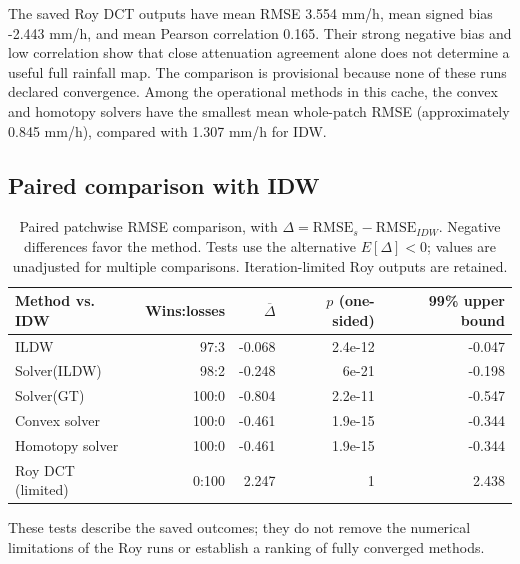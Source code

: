 \documentclass[a4paper,fleqn]{cas-sc}
\begin{document}
The saved Roy DCT outputs have mean RMSE 3.554 mm/h,
mean signed bias -2.443 mm/h, and mean Pearson correlation
0.165. Their strong negative bias and low correlation show that
close attenuation agreement alone does not determine a useful full rainfall
map. The comparison is provisional because none of these runs declared
convergence. Among the operational methods in this cache, the convex and
homotopy solvers have the smallest mean whole-patch RMSE (approximately
0.845 mm/h), compared with 1.307 mm/h for IDW.

\subsection{Paired comparison with IDW}
\begin{table}[!htbp]
\centering\small
\begin{tabular}{lrrrr}
\toprule
Method vs. IDW & Wins:losses & $\overline{\Delta}$ & $p$ (one-sided) & 99\% upper bound \\
\midrule
ILDW & 97:3 & -0.068 & 2.4e-12 & -0.047 \\
Solver(ILDW) & 98:2 & -0.248 & 6e-21 & -0.198 \\
Solver(GT) & 100:0 & -0.804 & 2.2e-11 & -0.547 \\
Convex solver & 100:0 & -0.461 & 1.9e-15 & -0.344 \\
Homotopy solver & 100:0 & -0.461 & 1.9e-15 & -0.344 \\
Roy DCT (limited) & 0:100 & 2.247 & 1 & 2.438 \\
\bottomrule
\end{tabular}
\caption{Paired patchwise RMSE comparison, with $\Delta=\mathrm{RMSE}_{s}-\mathrm{RMSE}_{IDW}$. Negative differences favor the method. Tests use the alternative $E[\Delta]<0$; values are unadjusted for multiple comparisons. Iteration-limited Roy outputs are retained.}
\label{tab:paired-rmse-t-test}
\end{table}

These tests describe the saved outcomes; they do not remove the numerical
limitations of the Roy runs or establish a ranking of fully converged methods.
\end{document}
